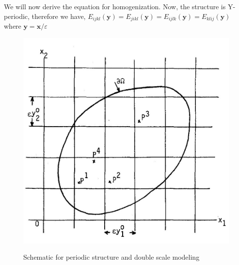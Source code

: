 \documentclass[openright,twoside]{iitkthesis}
\newcommand{\e}[1]{\textbf{#1}}
\newcommand{\fj}[2]{\frac{\partial #1}{\partial #2}}
\begin{document}
%
We will now derive the equation for homogenization. 
Now, the structure is Y-periodic, therefore we have, $E_{ijkl}(\e y) =E_{jikl}(\e y) =E_{ijlk}(\e y) =E_{klij}(\e y)$ where $\e y = \e x/\varepsilon$
\begin{figure}[H]
\begin{center}
	\includegraphics[scale=0.2]{./Plots/homo/2.jpg}
	\label{fig:doublescale}
	\caption{Schematic for periodic structure and double scale modeling}
\end{center}
\end{figure}
\end{document}
